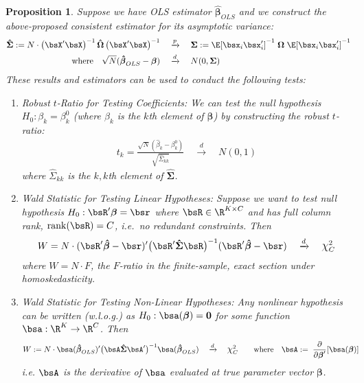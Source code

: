 \documentclass[12pt]{article}
\theoremstyle{plain}
\newtheorem{prop}[thm]{Proposition}
\theoremstyle{definition}
\theoremstyle{remark}
\newcommand*{\Chi}{\mbox{\large$\chi$}} %
\newcommand{\ra}{\rightarrow}
\newcommand{\bsSigma}{\boldsymbol{\Sigma}}
\newcommand{\bsbeta}{\boldsymbol{\beta}}
\newcommand{\bsOmega}{\boldsymbol{\Omega}}
\newcommand{\bshatbeta}{\boldsymbol{\hat{\beta}}}
\newcommand{\bshatSigma}{\boldsymbol{\hat{\Sigma}}}
\newcommand{\bshatOmega}{\boldsymbol{\hat{\Omega}}}
\renewcommand{\bso}{\boldsymbol{0}}
\newcommand{\rank}{\operatorname{rank}}
\newcommand{\pto}{\xrightarrow{p}}
\newcommand{\dto}{\xrightarrow{d}}
\begin{document}
\begin{prop}
Suppose we have OLS estimator $\bshatbeta_{OLS}$ and we construct the
above-proposed consistent estimator for its asymptotic variance:
\begin{align}
  \bshatSigma :=
  N\cdot
  \left(\bsX'\bsX\right)^{-1}
  \bshatOmega
  \left(\bsX'\bsX\right)^{-1}
  \quad&\pto\quad
  \bsSigma :=
  \E[\bsx_i\bsx_i']^{-1}\;\bsOmega\;\E[\bsx_i\bsx_i']^{-1}
  \notag\\
  \text{where}\quad
  \sqrt{N}(\bshatbeta_{OLS} - \bsbeta)
  \quad &\dto \quad
  N(0,\bsSigma) \label{trobust}
\end{align}
These results and estimators can be used to conduct the following tests:
\begin{enumerate}
  \item \emph{Robust $t$-Ratio for Testing Coefficients}: We can
    test the null hypothesis $H_0:\beta_k = \beta_k^0$ (where $\beta_k$
    is the $k$th element of $\bsbeta$) by constructing the
    \emph{robust $t$-ratio}:
    \begin{align*}
      t_k =
      \frac{\sqrt{N}(\hat{\beta}_k-\beta_k^0)}{\sqrt{\hat{\Sigma}_{kk}}}
      \quad\dto \quad N(0,1)
    \end{align*}
    where $\hat{\Sigma}_{kk}$ is the $k,k$th element of $\bshatSigma$.

  \item \emph{Wald Statistic for Testing Linear Hypotheses}:
    Suppose we want to test null hypothesis
    $H_0: \bsR'\bsbeta = \bsr$
    where $\bsR \in \R^{K \times C}$
    and has full column rank,
    $\rank(\bsR) = C$, i.e.\ no redundant constraints.
    Then
    \begin{align*}
      W = N\cdot
      (\bsR'\bshatbeta-\bsr)'
      \big(
      \bsR'\bshatSigma\bsR
      \big)^{-1}
      (\bsR'\bshatbeta-\bsr)
      \quad\dto\quad
      \Chi^2_C
    \end{align*}
    where $W = N\cdot F$, the $F$-ratio in the finite-sample, exact
    section under homoskedasticity.

  \item \emph{Wald Statistic for Testing Non-Linear Hypotheses}:
    Any nonlinear hypothesis can be written (w.l.o.g.) as
    $H_0: \bsa(\bsbeta) = \bso$ for some function $\bsa:\R^K\ra \R^C$.
    Then
    \begin{align*}
      W :=
      N \cdot \bsa(\bshatbeta_{OLS})'
      \big(
      \bsA \bshatSigma \bsA'
      \big)^{-1}
      \bsa(\bshatbeta_{OLS})
      \quad&\dto\quad
      \Chi^2_C
      \qquad
      \text{where} \quad
      \bsA := \; \frac{\partial}{\partial \bsbeta'}[\bsa(\bsbeta)]
    \end{align*}
    i.e. $\bsA$ is the derivative of $\bsa$ evaluated at true parameter
    vector $\bsbeta$.


\end{enumerate}
\end{prop}
\end{document}
